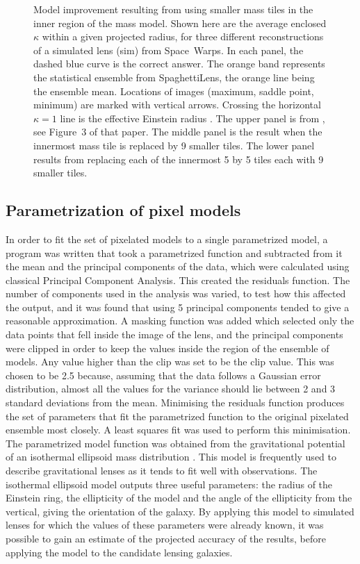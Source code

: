 \begin{figure}
  \caption{Model improvement resulting from using smaller mass tiles
    in the inner region of the mass model.  Shown here are the average
    enclosed $\kappa$ within a given projected radius, for three
    different reconstructions of a simulated lens (sim) from
    Space~Warps.  In each panel, the dashed blue curve is the correct
    answer.  The orange band represents the statistical ensemble from
    SpaghettiLens, the orange line being the ensemble mean.  Locations of
    images (maximum, saddle point, minimum) are marked with vertical
    arrows.  Crossing the horizontal $\kappa=1$ line is the effective
    Einstein radius \ER. The upper panel is from
    \citet{2015MNRAS.447.2170K}, see Figure~3 of that paper.  The middle
    panel is the result when the innermost mass tile is replaced by 9
    smaller tiles.  The lower panel results from replacing each of the
    innermost 5 by 5 tiles each with 9 smaller tiles.}
  \label{fig:subsampling}
\end{figure}

\subsection{Parametrization of pixel models} \label{subsec:parameter}

In order to fit the set of pixelated models to a single parametrized model, a 
program was written that took a parametrized function and subtracted from it 
the mean and the principal components of the data, which were calculated using 
classical Principal Component Analysis. This created the residuals function. 
The number of components used in the analysis was varied, to test how this 
affected the output, and it was found that using 5 principal components tended 
to give a reasonable approximation. A masking function was added which 
selected only the data points that fell inside the image of the lens, and the 
principal components were clipped in order to keep the values inside the 
region of the ensemble of models. Any value higher than the clip was set to be 
the clip value. This was chosen to be 2.5 because, assuming that the data 
follows a Gaussian error distribution, almost all the values for the variance 
should lie between 2 and 3 standard deviations from the mean. Minimising the 
residuals function produces the set of parameters that fit the 
parametrized function to the original pixelated ensemble most closely.
A least squares fit was used to perform this minimisation.
The parametrized model function was obtained from the gravitational potential 
of an isothermal ellipsoid mass distribution \citep{2001astro.ph..2341K}.
This model is frequently used to describe gravitational lenses as it tends to 
fit well with observations.
The isothermal ellipsoid model outputs three useful parameters: the radius of 
the Einstein ring, the ellipticity of the model and the angle of the 
ellipticity from the vertical, giving the orientation of the galaxy.
By applying this model to simulated lenses for which the values of these 
parameters were already known, it was possible to gain an estimate of the 
projected accuracy of the results, before applying the model to the candidate 
lensing galaxies.

